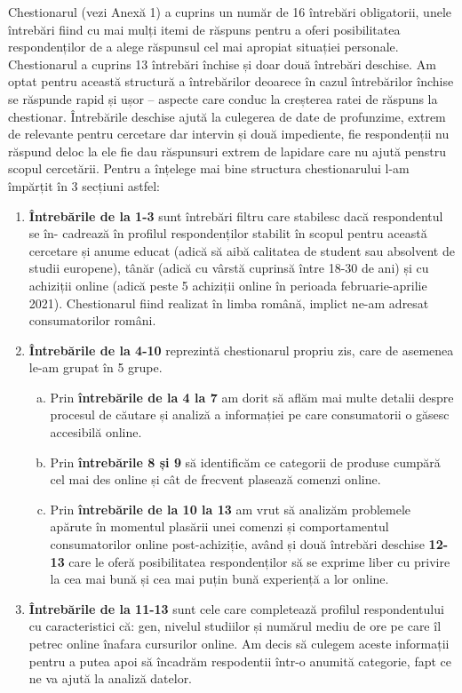 \documentclass[a4paper, 12pt]{article}
\begin{document}
		\quad Chestionarul (vezi Anexă 1) a cuprins un număr de 16 întrebări obligatorii, unele întrebări fiind cu mai mulți itemi de răspuns pentru a oferi posibilitatea respondenților de a alege răspunsul cel mai apropiat situației personale. Chestionarul a cuprins 13 întrebări închise și doar două întrebări deschise. Am optat pentru această structură a întrebărilor deoarece în cazul întrebărilor închise se răspunde rapid și ușor – aspecte care conduc la creșterea ratei de răspuns la chestionar. Întrebările deschise  ajută la culegerea de date de profunzime, extrem de relevante pentru cercetare dar intervin și două impediente, fie respondenții nu răspund deloc la ele fie dau răspunsuri extrem de lapidare care nu ajută penstru scopul cercetării. Pentru a înțelege mai bine structura chestionarului l-am împărțit în 3 secțiuni astfel:
		\begin{enumerate}[(1)]
			\item\textbf{Întrebările de la 1-3}  sunt întrebări filtru care stabilesc dacă respondentul se în- cadrează în profilul respondenților stabilit în scopul pentru această cercetare și anume educat (adică să aibă calitatea de student sau absolvent de studii europene), tânăr (adică cu vârstă cuprinsă între 18-30 de ani) și cu achiziții online (adică peste 5 achiziții online în perioada februarie-aprilie 2021). Chestionarul fiind realizat în limba română, implict ne-am adresat consumatorilor români. 
			\item\textbf{Întrebările de la 4-10} reprezintă chestionarul propriu zis, care de asemenea le-am grupat în 5 grupe.
		\begin{enumerate}[(a)]
			\item Prin \textbf{întrebările de la 4 la 7} am dorit să aflăm mai multe detalii despre procesul de căutare și analiză a informației pe care consumatorii o găsesc accesibilă online.
			\item Prin \textbf{întrebările 8 și 9} să identificăm ce categorii de produse cumpără cel mai des online și cât de frecvent plasează comenzi online.
			\item Prin \textbf{întrebările de la 10 la 13} am vrut să analizăm problemele apărute în momentul plasării unei comenzi și comportamentul consumatorilor online post-achiziție, având și două întrebări deschise \textbf {12-13} care le oferă posibilitatea respondenților să se exprime liber cu privire la cea mai bună și cea mai puțin bună experiență a lor online.
		\end{enumerate}
		\item\textbf{Întrebările de la 11-13} sunt cele care completează profilul respondentului cu caracteristici că: gen, nivelul studiilor și numărul mediu de ore pe care îl petrec online înafara cursurilor online. Am decis să culegem aceste informații pentru a putea apoi să încadrăm respodentii într-o anumită categorie, fapt ce ne va ajută la analiză datelor.
	\end{enumerate}
\end{document}
